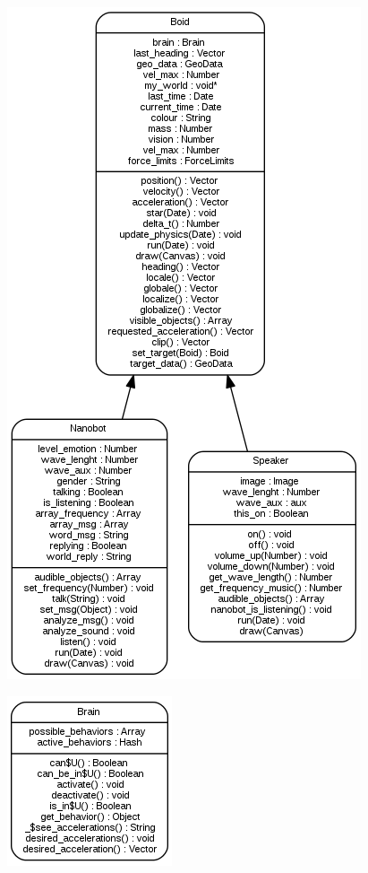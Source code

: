 \begin{figure}[H]
 \centering
 \includegraphics[scale=0.5]{../images/boid_diagram.png}

 \label{fig:../images/boid_diagram.png}
\end{figure}

\begin{figure}[H]
 \centering
 \includegraphics[scale=0.5]{../images/brain_diagram.png}

 \label{fig:../images/brain_diagram.png}
\end{figure}

